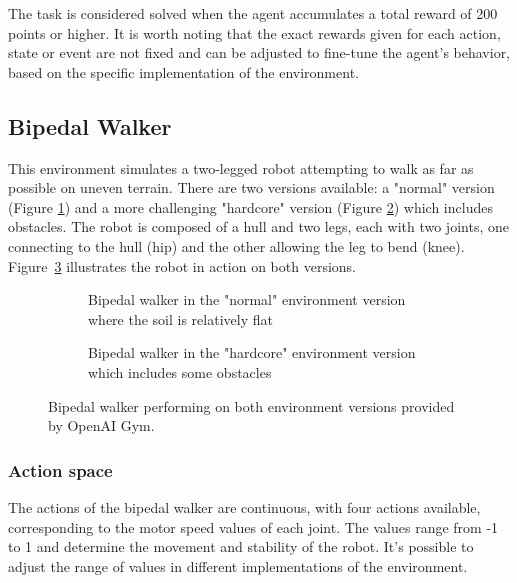 The task is considered solved when the agent accumulates a total reward of 200 points or higher. It is worth noting that the exact rewards given for each action, state or event are not fixed and can be adjusted to fine-tune the agent's behavior, based on the specific implementation of the environment.

\subsection{Bipedal Walker}
This environment simulates a two-legged robot attempting to walk as far as possible on uneven terrain. There are two versions available: a "normal" version (Figure \ref{bipedal_normal}) and a more challenging "hardcore" version (Figure \ref{bipedal_hardcore}) which includes obstacles. The robot is composed of a hull and two legs, each with two joints, one connecting to the hull (hip) and the other allowing the leg to bend (knee). Figure~\ref{fig:bipedal_walker} illustrates the robot in action on both versions.

\begin{figure}[!ht]
    \centering
    \begin{subfigure}{.48\textwidth}
        \centering
        \caption{Bipedal walker in the "normal" environment version where the soil is relatively flat} 
        \label{bipedal_normal}
    \end{subfigure}%
    \hspace{1em}
    \begin{subfigure}{.48\textwidth}
        \centering
        \caption{Bipedal walker in the "hardcore" environment version which includes some obstacles} 
        \label{bipedal_hardcore}
    \end{subfigure}
    \caption{Bipedal walker performing on both environment versions provided by OpenAI Gym.}
    \label{fig:bipedal_walker}
\end{figure}

\subsubsection{Action space}
The actions of the bipedal walker are continuous, with four actions available, corresponding to the motor speed values of each joint. The values range from -1 to 1 and determine the movement and stability of the robot. It's possible to adjust the range of values in different implementations of the environment.

